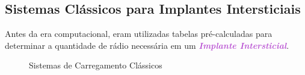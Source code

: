 \documentclass[11pt,a4paper]{article}
\begin{document}
		
\subsection*{Sistemas Clássicos para Implantes Intersticiais}

			Antes da era computacional, eram utilizadas tabelas pré-calculadas para determinar a quantidade de rádio necessária em um \textit{\textbf{\textcolor{MediumOrchid}{Implante Intersticial}}}.

			\begin{figure}[h]
				\centering
				\caption{Sistemas de Carregamento Clássicos}
				\label{img:carregamentosHistoricos}
			\end{figure} 
\end{document}
